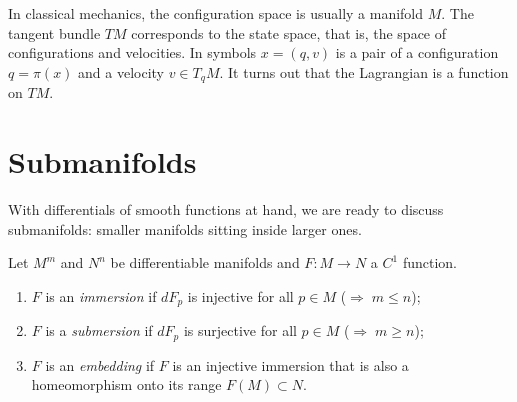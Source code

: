\begin{rmk}
    In classical mechanics, the configuration space is usually a manifold $M$.
    The tangent bundle $TM$ corresponds to the state space, that is, the space of configurations and velocities. In symbols $x=(q,v)$ is a pair of a configuration $q = \pi(x)$ and a velocity $v\in T_q M$.
    It turns out that the Lagrangian is a function on $TM$.
\end{rmk}

\section{Submanifolds}

With differentials of smooth functions at hand, we are ready to discuss submanifolds: smaller manifolds sitting inside larger ones.

\begin{defn}
    Let $M^m$ and $N^n$ be differentiable manifolds and $F:M\to N$ a $C^1$ function.
    \begin{enumerate}
        \item $F$ is an \emph{immersion} if $dF_p$ is injective for all $p\in M$ ($\Rightarrow\; m\leq n$);
        \item $F$ is a \emph{submersion} if $dF_p$ is surjective for all $p\in M$ ($\Rightarrow\; m\geq n$);
        \item $F$ is an \emph{embedding} if $F$ is an injective immersion that is also a homeomorphism onto its range $F(M)\subset N$.
    \end{enumerate}
\end{defn}

